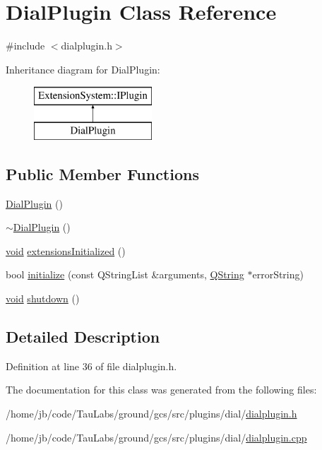 \hypertarget{class_dial_plugin}{\section{\-Dial\-Plugin \-Class \-Reference}
\label{class_dial_plugin}
}


{\ttfamily \#include $<$dialplugin.\-h$>$}

\-Inheritance diagram for \-Dial\-Plugin\-:\begin{figure}[H]
\begin{center}
\leavevmode
\includegraphics[height=2.000000cm]{class_dial_plugin}
\end{center}
\end{figure}
\subsection*{\-Public \-Member \-Functions}
\begin{DoxyCompactItemize}
\item 
\hyperlink{group___dial_plugin_ga414d0b2d29e6c9d41df85ac25e1899fa}{\-Dial\-Plugin} ()
\item 
\hyperlink{group___dial_plugin_gaea6ec646d171578f8a22d63b9b28016c}{$\sim$\-Dial\-Plugin} ()
\item 
\hyperlink{group___u_a_v_objects_plugin_ga444cf2ff3f0ecbe028adce838d373f5c}{void} \hyperlink{group___dial_plugin_gac703254d72e140e8ff7b4c23ddb46020}{extensions\-Initialized} ()
\item 
bool \hyperlink{group___dial_plugin_ga59561e7e0f5635938f8b83931c025b67}{initialize} (const \-Q\-String\-List \&arguments, \hyperlink{group___u_a_v_objects_plugin_gab9d252f49c333c94a72f97ce3105a32d}{\-Q\-String} $\ast$error\-String)
\item 
\hyperlink{group___u_a_v_objects_plugin_ga444cf2ff3f0ecbe028adce838d373f5c}{void} \hyperlink{group___dial_plugin_ga096efc39bed83964551f3a4a8bd1a29d}{shutdown} ()
\end{DoxyCompactItemize}


\subsection{\-Detailed \-Description}


\-Definition at line 36 of file dialplugin.\-h.



\-The documentation for this class was generated from the following files\-:\begin{DoxyCompactItemize}
\item 
/home/jb/code/\-Tau\-Labs/ground/gcs/src/plugins/dial/\hyperlink{dialplugin_8h}{dialplugin.\-h}\item 
/home/jb/code/\-Tau\-Labs/ground/gcs/src/plugins/dial/\hyperlink{dialplugin_8cpp}{dialplugin.\-cpp}\end{DoxyCompactItemize}
